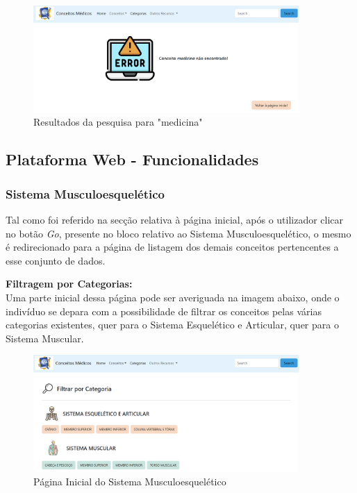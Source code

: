 \begin{itemize}
    \begin{figure}[H]
        \centering
        \centering
        \includegraphics[width=0.9\textwidth]{Images/pesquisa3.png}
        \caption{Resultados da pesquisa para "medicina"}
        \label{fig:dic-traduc1}
    \end{figure}
    
\end{itemize}

\subsection{Plataforma Web - Funcionalidades}

\subsubsection{Sistema Musculoesquelético}

Tal como foi referido na secção relativa à página inicial, após o utilizador clicar no botão \textit{Go}, presente no bloco relativo ao Sistema Musculoesquelético, o mesmo é redirecionado para a página de listagem dos demais conceitos pertencentes a esse conjunto de dados.

\textbf{Filtragem por Categorias:}\\

Uma parte inicial dessa página pode ser averiguada na imagem abaixo, onde o indivíduo se depara com a possibilidade de filtrar os conceitos pelas várias categorias existentes, quer para o Sistema Esquelético e Articular, quer para o Sistema Muscular.

\begin{figure}[H]
    \centering
    \centering
    \includegraphics[width=0.9\textwidth]{Images/musculo1.png}
    \caption{Página Inicial do Sistema Musculoesquelético}
    \label{fig:dic-traduc1}
\end{figure}

